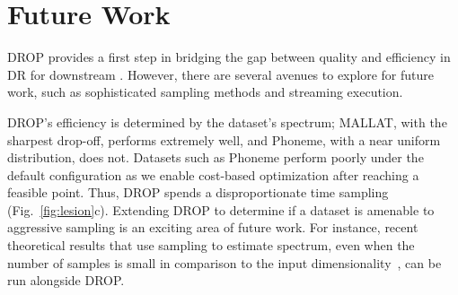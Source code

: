 \section{Future Work}
\label{subsec:disc}

DROP provides a first step in bridging the gap between quality and efficiency in DR for downstream .
However, there are several avenues to explore for future work, such as sophisticated sampling methods and streaming execution.


DROP's efficiency is determined by the dataset's spectrum; MALLAT, with the sharpest drop-off, performs extremely well, and Phoneme, with a near uniform distribution, does not.
Datasets such as Phoneme perform poorly under the default configuration as we enable cost-based optimization after reaching a feasible point.
Thus, DROP spends a disproportionate time sampling (Fig.~\ref{fig:lesion}c). 
Extending DROP to determine if a dataset is amenable to aggressive sampling is an exciting area of future work. 
For instance, recent theoretical results that use sampling to estimate spectrum, even when the number of samples is small in comparison to the input dimensionality~\cite{estspec}, can be run alongside DROP.

